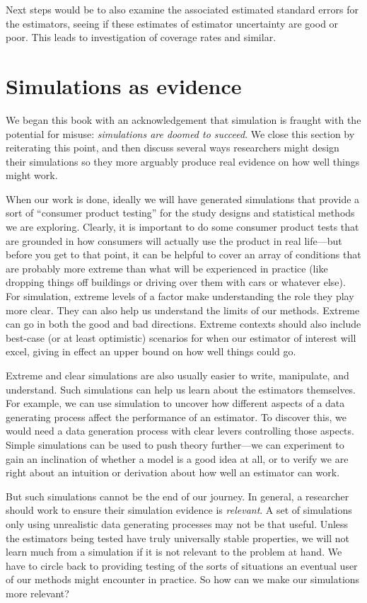 \documentclass[
]{book}
\begin{document}
Next steps would be to also examine the associated estimated standard errors
for the estimators, seeing if these estimates of estimator uncertainty are
good or poor. This leads to investigation of coverage rates and similar.

\chapter{Simulations as evidence}\label{simulations-as-evidence}

We began this book with an acknowledgement that simulation is fraught with the potential for misuse: \emph{simulations are doomed to succeed}.
We close this section by reiterating this point, and then discuss several ways researchers might design their simulations so they more arguably produce real evidence on how well things might work.

When our work is done, ideally we will have generated simulations that provide a sort of ``consumer product testing'' for the study designs and statistical methods we are exploring.
Clearly, it is important to do some consumer product tests that are grounded in how consumers will actually use the product in real life---but before you get to that point, it can be helpful to cover an array of conditions that are probably more extreme than what will be experienced in practice (like dropping things off buildings or driving over them with cars or whatever else).
For simulation, extreme levels of a factor make understanding the role they play more clear.
They can also help us understand the limits of our methods.
Extreme can go in both the good and bad directions.
Extreme contexts should also include best-case (or at least optimistic) scenarios for when our estimator of interest will excel, giving in effect an upper bound on how well things could go.

Extreme and clear simulations are also usually easier to write, manipulate, and understand.
Such simulations can help us learn about the estimators themselves.
For example, we can use simulation to uncover how different aspects of a data generating process affect the performance of an estimator.
To discover this, we would need a data generation process with clear levers controlling those aspects.
Simple simulations can be used to push theory further---we can experiment to gain an inclination of whether a model is a good idea at all, or to verify we are right about an intuition or derivation about how well an estimator can work.

But such simulations cannot be the end of our journey.
In general, a researcher should work to ensure their simulation evidence is \emph{relevant}.
A set of simulations only using unrealistic data generating processes may not be that useful.
Unless the estimators being tested have truly universally stable properties, we will not learn much from a simulation if it is not relevant to the problem at hand.
We have to circle back to providing testing of the sorts of situations an eventual user of our methods might encounter in practice.
So how can we make our simulations more relevant?
\end{document}

